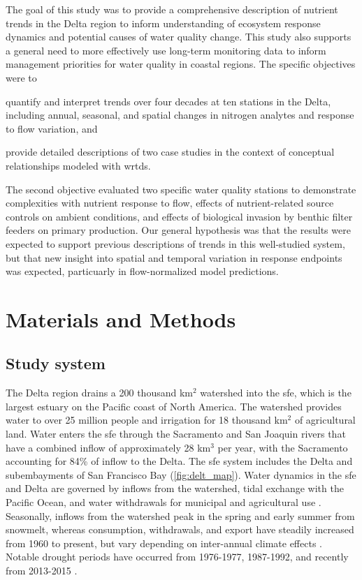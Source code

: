 \documentclass[letterpaper,12pt,oneside]{article}\usepackage[]{graphicx}\usepackage[]{color}
\begin{document}
The goal of this study was to provide a comprehensive description of nutrient trends in the Delta region to inform understanding of ecosystem response dynamics and potential causes of water quality change. This study also supports a general need to more effectively use long-term monitoring data to inform management priorities for water quality in coastal regions.  The specific objectives were to \begin{inparaenum}[1\upshape)]  
\item quantify and interpret trends over four decades at ten stations in the Delta, including annual, seasonal, and spatial changes in nitrogen analytes and response to flow variation, and
\item provide detailed descriptions of two case studies in the context of conceptual relationships modeled with \ac{wrtds}.
\end{inparaenum}
The second objective evaluated two specific water quality stations to demonstrate complexities with nutrient response to flow, effects of nutrient-related source controls on ambient conditions, and effects of biological invasion by benthic filter feeders on primary production.  Our general hypothesis was that the results were expected to support previous descriptions of trends in this well-studied system, but that new insight into spatial and temporal variation in response endpoints was expected, particuarly in flow-normalized model predictions.

\section{Materials and Methods}

\subsection{Study system}

The Delta region drains a 200 thousand km$^2$ watershed into the \ac{sfe}, which is the largest estuary on the Pacific coast of North America.  The watershed provides water to over 25 million people and irrigation for 18 thousand km$^2$ of agricultural land.  Water enters the \ac{sfe} through the Sacramento and San Joaquin rivers that have a combined inflow of approximately 28 km$^3$ per year, with the Sacramento accounting for 84\% of inflow to the Delta.  The \ac{sfe} system includes the Delta and subembayments of San Francisco Bay (\cref{fig:delt_map}).  Water dynamics in the \ac{sfe} and Delta are governed by inflows from the watershed, tidal exchange with the Pacific Ocean, and water withdrawals for municipal and agricultural use \citep{Jassby00}.  Seasonally, inflows from the watershed peak in the spring and early summer from snowmelt, whereas consumption, withdrawals, and export have steadily increased from 1960 to present, but vary depending on inter-annual climate effects \citep{Cloern12b}. Notable drought periods have occurred from 1976-1977, 1987-1992, and recently from 2013-2015 \citep{Cloern15}.
\end{document}
